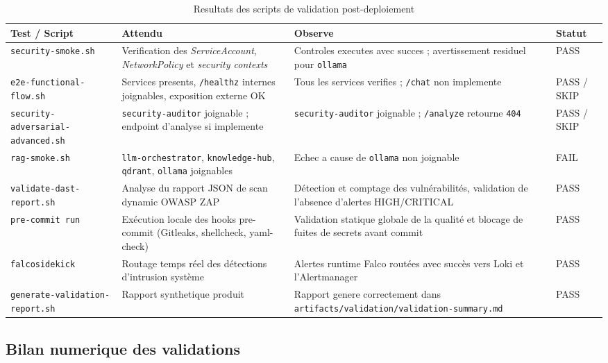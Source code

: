 \begin{table}[h]
\centering
\begin{tabular}{|p{3.8cm}|p{3.6cm}|p{4.6cm}|p{2.3cm}|}
\hline
\textbf{Test / Script} & \textbf{Attendu} & \textbf{Observe} & \textbf{Statut} \\
\hline
\texttt{security-smoke.sh} & Verification des \textit{ServiceAccount}, \textit{NetworkPolicy} et \textit{security contexts} & Controles executes avec succes ; avertissement residuel pour \texttt{ollama} & PASS \\
\hline
\texttt{e2e-functional-flow.sh} & Services presents, \texttt{/healthz} internes joignables, exposition externe OK & Tous les services verifies ; \texttt{/chat} non implemente & PASS / SKIP \\
\hline
\texttt{security-adversarial-advanced.sh} & \texttt{security-auditor} joignable ; endpoint d'analyse si implemente & \texttt{security-auditor} joignable ; \texttt{/analyze} retourne \texttt{404} & PASS / SKIP \\
\hline
\texttt{rag-smoke.sh} & \texttt{llm-orchestrator}, \texttt{knowledge-hub}, \texttt{qdrant}, \texttt{ollama} joignables & Echec a cause de \texttt{ollama} non joignable & FAIL \\
\hline
\texttt{validate-dast-report.sh} & Analyse du rapport JSON de scan dynamic OWASP ZAP & Détection et comptage des vulnérabilités, validation de l'absence d'alertes HIGH/CRITICAL & PASS \\
\hline
\texttt{pre-commit run} & Exécution locale des hooks pre-commit (Gitleaks, shellcheck, yaml-check) & Validation statique globale de la qualité et blocage de fuites de secrets avant commit & PASS \\
\hline
\texttt{falcosidekick} & Routage temps réel des détections d'intrusion système & Alertes runtime Falco routées avec succès vers Loki et l'Alertmanager & PASS \\
\hline
\texttt{generate-validation-report.sh} & Rapport synthetique produit & Rapport genere correctement dans \texttt{artifacts/validation/validation-summary.md} & PASS \\
\hline
\end{tabular}
\caption{Resultats des scripts de validation post-deploiement}
\end{table}

\subsection{Bilan numerique des validations}

